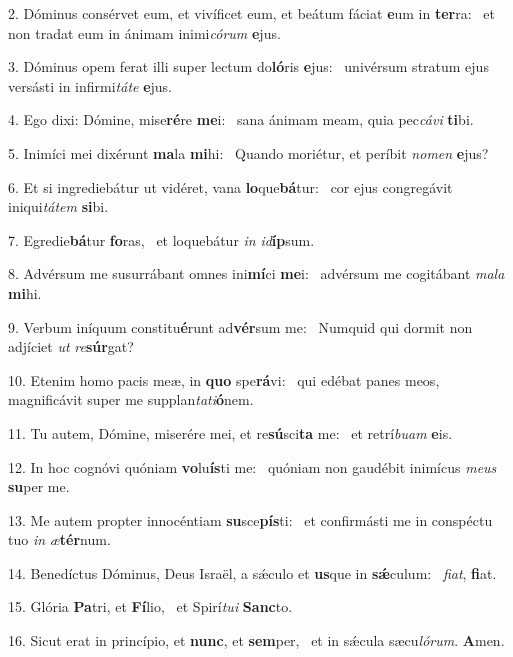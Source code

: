 2. Dóminus consérvet eum, et vivíficet eum, et beátum fáciat \textbf{e}um in \textbf{ter}ra: \ast\  et non tradat eum in ánimam inimi\textit{có}\textit{rum} \textbf{e}jus.\

3. Dóminus opem ferat illi super lectum do\textbf{ló}ris \textbf{e}jus: \ast\  univérsum stratum ejus versásti in infirmi\textit{tá}\textit{te} \textbf{e}jus.\

4. Ego dixi: Dómine, mise\textbf{ré}re \textbf{me}i: \ast\  sana ánimam meam, quia pec\textit{cá}\textit{vi} \textbf{ti}bi.\

5. Inimíci mei dixérunt \textbf{ma}la \textbf{mi}hi: \ast\  Quando moriétur, et períbit \textit{no}\textit{men} \textbf{e}jus?\

6. Et si ingrediebátur ut vidéret, vana \textbf{lo}que\textbf{bá}tur: \ast\  cor ejus congregávit iniqui\textit{tá}\textit{tem} \textbf{si}bi.\

7. Egredie\textbf{bá}tur \textbf{fo}ras, \ast\  et loquebátur \textit{in} \textit{id}\textbf{íp}sum.\

8. Advérsum me susurrábant omnes ini\textbf{mí}ci \textbf{me}i: \ast\  advérsum me cogitábant \textit{ma}\textit{la} \textbf{mi}hi.\

9. Verbum iníquum constitu\textbf{é}runt ad\textbf{vér}sum me: \ast\  Numquid qui dormit non adjíciet \textit{ut} \textit{re}\textbf{súr}gat?\

10. Etenim homo pacis meæ, in \textbf{quo} spe\textbf{rá}vi: \ast\  qui edébat panes meos, magnificávit super me supplan\textit{ta}\textit{ti}\textbf{ó}nem.\

11. Tu autem, Dómine, miserére mei, et re\textbf{sú}sci\textbf{ta} me: \ast\  et retrí\textit{bu}\textit{am} \textbf{e}is.\

12. In hoc cognóvi quóniam \textbf{vo}lu\textbf{ís}ti me: \ast\  quóniam non gaudébit inimícus \textit{me}\textit{us} \textbf{su}per me.\

13. Me autem propter innocéntiam \textbf{su}sce\textbf{pís}ti: \ast\  et confirmásti me in conspéctu tuo \textit{in} \textit{æ}\textbf{tér}num.\

14. Benedíctus Dóminus, Deus Israël, a sǽculo et \textbf{us}que in \textbf{sǽ}culum: \ast\  \textit{fi}\textit{at}, \textbf{fi}at.\

15. Glória \textbf{Pa}tri, et \textbf{Fí}lio, \ast\  et Spirí\textit{tu}\textit{i} \textbf{Sanc}to.\

16. Sicut erat in princípio, et \textbf{nunc}, et \textbf{sem}per, \ast\  et in sǽcula sæcu\textit{ló}\textit{rum}. \textbf{A}men.\

